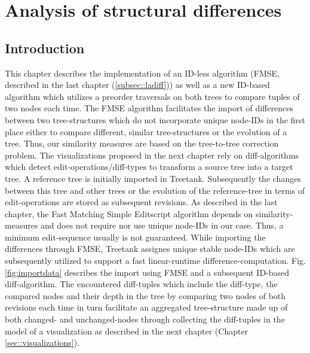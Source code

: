\section{Analysis of structural differences}\label{sec::differences}
\subsection{Introduction}
This chapter describes the implementation of an ID-less algorithm (FMSE, described in the last chapter (\ref{subsec::ladiff})) as well as a new ID-based algorithm which utilizes a preorder traversals on both trees to compare tuples of two nodes each time. The FMSE algorithm facilitates the import of differences between two tree-structures which do not incorporate unique node-IDs in the first place either to compare different, similar tree-structures or the evolution of a tree. Thus, our similarity measures are based on the tree-to-tree correction problem. The visualizations proposed in the next chapter rely on diff-algorithms which detect edit-operations/diff-types to transform a source tree into a target tree. A reference tree is initially imported in Treetank. Subsequently the changes between this tree and other trees or the evolution of the reference-tree in terms of edit-operations are stored as subsequent revisions. As described in the last chapter, the Fast Matching Simple Editscript algorithm depends on similarity-measures and does not require nor use unique node-IDs in our case. Thus, a minimum edit-sequence usually is not guaranteed. While importing the differences through FMSE, Treetank assignes unique stable node-IDs which are subsequently utilized to support a fast linear-runtime difference-computation. Fig. \ref{fig:importdata} describes the import using FMSE and a subsequent ID-based diff-algorithm. The encountered diff-tuples which include the diff-type, the compared nodes and their depth in the tree by comparing two nodes of both revisions each time in turn facilitate an aggregated tree-structure made up of both changed- and unchanged-nodes through collecting the diff-tuples in the model of a visualization as described in the next chapter (Chapter \ref{sec::visualizations}). 


